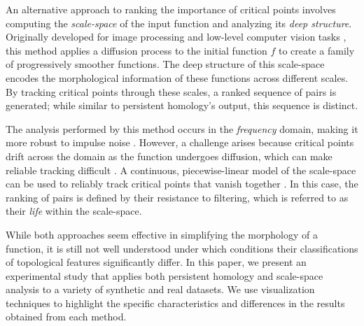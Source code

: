 An alternative approach to ranking the importance of critical points involves computing the \emph{scale-space} of the input function and analyzing its \emph{deep structure}. 
Originally developed for image processing and low-level computer vision tasks \cite{lindeberg94}, this method applies a diffusion process to the initial function $f$ to create a family of progressively smoother functions. 
The deep structure of this scale-space encodes the morphological information of these functions across different scales. By tracking critical points through these scales, a ranked sequence of pairs is generated; while similar to persistent homology's output, this sequence is distinct.

The analysis performed by this method occurs in the \emph{frequency} domain, making it more robust to impulse noise \cite{Rocca23}. 
However, a challenge arises because critical points drift across the domain as the function undergoes diffusion, which can make reliable tracking difficult \cite{reininghaus11}. 
A continuous, piecewise-linear model of the scale-space can be used to reliably track critical points that vanish together \cite{Rocca:2013}. 
In this case, the ranking of pairs is defined by their resistance to filtering, which is referred to as their \emph{life} within the scale-space.

While both approaches seem effective in simplifying the morphology of a function, it is still not well understood under which conditions their classifications of topological features significantly differ.
In this paper, we present an experimental study that applies both persistent homology and scale-space analysis to a variety of synthetic and real datasets. We use visualization techniques to highlight the specific characteristics and differences in the results obtained from each method.

